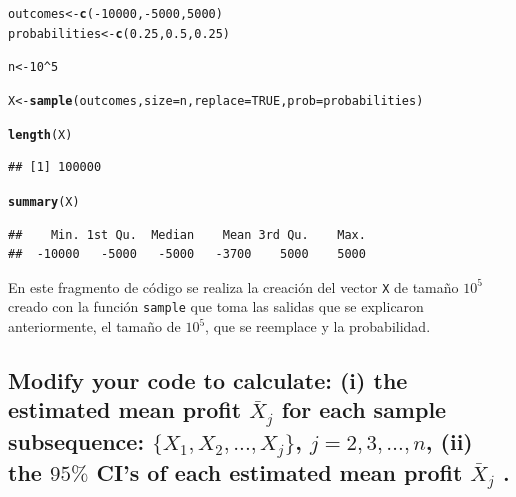 \documentclass[12pt]{article}\usepackage[]{graphicx}\usepackage[]{xcolor}
\makeatletter
\newcommand{\hlnum}[1]{\textcolor[rgb]{0.686,0.059,0.569}{#1}}%
\newcommand{\hlopt}[1]{\textcolor[rgb]{0,0,0}{#1}}%
\newcommand{\hldef}[1]{\textcolor[rgb]{0.345,0.345,0.345}{#1}}%
\newcommand{\hlkwb}[1]{\textcolor[rgb]{0.69,0.353,0.396}{#1}}%
\newcommand{\hlkwc}[1]{\textcolor[rgb]{0.333,0.667,0.333}{#1}}%
\newcommand{\hlkwd}[1]{\textcolor[rgb]{0.737,0.353,0.396}{\textbf{#1}}}%
\newenvironment{kframe}{%
 \def\at@end@of@kframe{}%
 \ifinner\ifhmode%
  \def\at@end@of@kframe{\end{minipage}}%
  \begin{minipage}{\columnwidth}%
 \fi\fi%
 \def\FrameCommand##1{\hskip\@totalleftmargin \hskip-\fboxsep
 \colorbox{shadecolor}{##1}\hskip-\fboxsep
     \hskip-\linewidth \hskip-\@totalleftmargin \hskip\columnwidth}%
 \MakeFramed {\advance\hsize-\width
   \@totalleftmargin\z@ \linewidth\hsize
   \@setminipage}}%
 {\par\unskip\endMakeFramed%
 \at@end@of@kframe}
\newenvironment{knitrout}{}{} %
\makeatother
\begin{document}
\begin{knitrout}
\color{fgcolor}\begin{kframe}
\begin{alltt}
\hldef{outcomes} \hlkwb{<-} \hlkwd{c}\hldef{(}\hlopt{-}\hlnum{10000}\hldef{,} \hlopt{-}\hlnum{5000}\hldef{,} \hlnum{5000}\hldef{)}
\hldef{probabilities} \hlkwb{<-} \hlkwd{c}\hldef{(}\hlnum{0.25}\hldef{,} \hlnum{0.5}\hldef{,} \hlnum{0.25}\hldef{)}

\hldef{n} \hlkwb{<-} \hlnum{10}\hlopt{^}\hlnum{5}

\hldef{X} \hlkwb{<-} \hlkwd{sample}\hldef{(outcomes,} \hlkwc{size} \hldef{= n ,} \hlkwc{replace} \hldef{=} \hlnum{TRUE}\hldef{,} \hlkwc{prob} \hldef{= probabilities)}

\hlkwd{length}\hldef{(X)}
\end{alltt}
\begin{verbatim}
## [1] 100000
\end{verbatim}
\begin{alltt}
\hlkwd{summary}\hldef{(X)}
\end{alltt}
\begin{verbatim}
##    Min. 1st Qu.  Median    Mean 3rd Qu.    Max. 
##  -10000   -5000   -5000   -3700    5000    5000
\end{verbatim}
\end{kframe}
\end{knitrout}

En este fragmento de código se realiza la creación del vector \lstinline|X| de tamaño $10^{5}$ creado con la función \lstinline|sample| que toma las salidas que se explicaron anteriormente, el tamaño de $10^{5}$, que se reemplace y la probabilidad.


\subsection{Modify your code to calculate: (i) the estimated mean profit $\bar{X}_{j}$ for each sample subsequence: $\{X_{1}, X_{2}, . . . , X_{j} \}$, $j = 2, 3, \dots, n$, (ii) the $95 \%$ CI’s of each estimated mean profit $\bar{X}_{j}$ .}
\end{document}
